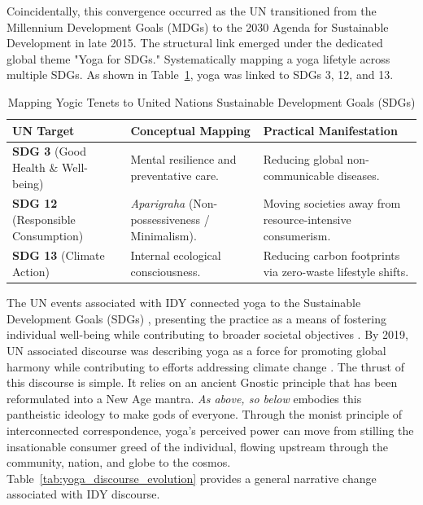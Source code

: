 \documentclass[11pt]{article}
\begin{document}
Coincidentally, this convergence occurred as the UN transitioned from the Millennium Development Goals (MDGs) to the 2030 Agenda for Sustainable Development in late 2015. The structural link emerged under the dedicated global theme "Yoga for SDGs." Systematically mapping a yoga lifetyle across multiple SDGs. As shown in Table~\ref{tab:yoga_sdg_mapping}, yoga was linked to SDGs 3, 12, and 13.

\begin{table}[htbp]
\centering
\caption{Mapping Yogic Tenets to United Nations Sustainable Development Goals (SDGs)}
\label{tab:yoga_sdg_mapping}
\begin{tabular}{p{4.5cm} p{5cm} p{5.5cm}}
\hline
\textbf{UN Target} & \textbf{Conceptual Mapping} & \textbf{Practical Manifestation} \\ \hline
\textbf{SDG 3} (Good Health \& Well-being) & Mental resilience and preventative care. & Reducing global non-communicable diseases. \\ \hline
\textbf{SDG 12} (Responsible Consumption) & \textit{Aparigraha} (Non-possessiveness / Minimalism). & Moving societies away from resource-intensive consumerism. \\ \hline
\textbf{SDG 13} (Climate Action) & Internal ecological consciousness. & Reducing carbon footprints via zero-waste lifestyle shifts. \\ \hline
\end{tabular}
\end{table}


The UN events associated with IDY connected yoga to the Sustainable Development Goals (SDGs) \cite{bhagwat2019}, presenting the practice as a means of fostering individual well-being while contributing to broader societal objectives \cite{un2016a,un2016b}. By 2019, UN associated discourse was describing yoga as a force for promoting global harmony while contributing to efforts addressing climate change \cite{un2019}. The thrust of this discourse is simple. It relies on an ancient Gnostic principle that has been reformulated into a New Age mantra. \emph{As above, so below} embodies this pantheistic ideology to make gods of everyone. Through the monist principle of interconnected correspondence, yoga's perceived power can move from stilling the insationable consumer greed of the individual, flowing upstream through the community, nation, and globe to the cosmos. Table~\ref{tab:yoga_discourse_evolution} provides a general narrative change associated with IDY discourse.
\end{document}
